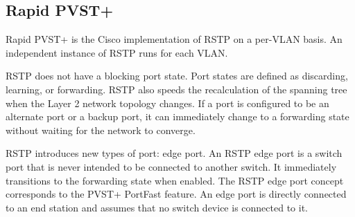 \subsection{Rapid PVST+}
Rapid PVST+ is the Cisco implementation of RSTP on a per-VLAN basis. An independent instance of RSTP runs for each VLAN.\par 
RSTP does not have a blocking port state. Port states are defined as discarding, learning, or forwarding. RSTP also speeds the recalculation of the spanning tree when the Layer 2 network topology changes. If a port is configured to be an alternate port or a backup port, it can immediately change to a forwarding state without waiting for the network to converge.\par 
RSTP introduces new types of port: edge port. An RSTP edge port is a switch port that is never intended to be connected to another switch. It immediately transitions to the forwarding state when enabled. The RSTP edge port concept corresponds to the PVST+ PortFast feature. An edge port is directly connected to an end station and assumes that no switch device is connected to it.